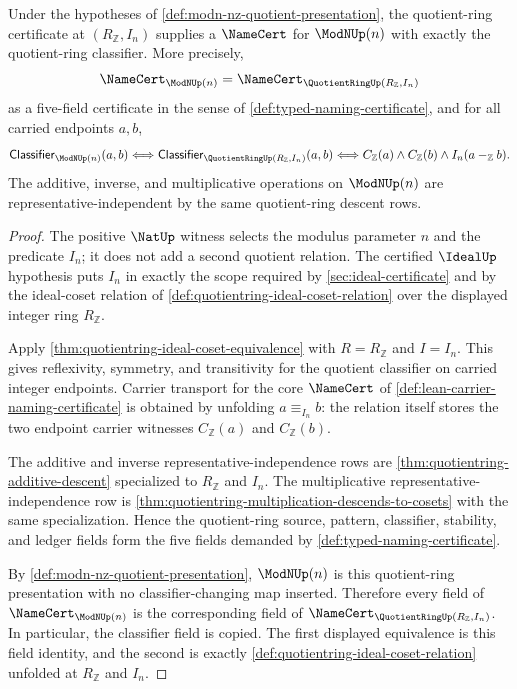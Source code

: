 \begin{theorem}
\label{thm:modn-nz-quotient-certificate}
Under the hypotheses of \autoref{def:modn-nz-quotient-presentation}, the quotient-ring certificate at $(R_{\mathbb{Z}},I_n)$ supplies a $\NameCert$ for $\ModNUp(n)$ with exactly the quotient-ring classifier. More precisely,
$$
\NameCert_{\ModNUp(n)}=
\NameCert_{\QuotientRingUp(R_{\mathbb{Z}},I_n)}
$$
as a five-field certificate in the sense of \autoref{def:typed-naming-certificate}, and for all carried endpoints $a,b$,
$$
\mathsf{Classifier}_{\ModNUp(n)}(a,b)
\Longleftrightarrow
\mathsf{Classifier}_{\QuotientRingUp(R_{\mathbb{Z}},I_n)}(a,b)
\Longleftrightarrow
C_{\mathbb{Z}}(a)\land C_{\mathbb{Z}}(b)\land I_n(a-_{\mathbb{Z}}b).
$$
The additive, inverse, and multiplicative operations on $\ModNUp(n)$ are representative-independent by the same quotient-ring descent rows.
\end{theorem}
\begin{proof}
The positive $\NatUp$ witness selects the modulus parameter $n$ and the predicate $I_n$; it does not add a second quotient relation. The certified $\IdealUp$ hypothesis puts $I_n$ in exactly the scope required by \autoref{sec:ideal-certificate} and by the ideal-coset relation of \autoref{def:quotientring-ideal-coset-relation} over the displayed integer ring $R_{\mathbb{Z}}$.

Apply \autoref{thm:quotientring-ideal-coset-equivalence} with $R=R_{\mathbb{Z}}$ and $I=I_n$. This gives reflexivity, symmetry, and transitivity for the quotient classifier on carried integer endpoints. Carrier transport for the core $\NameCert$ of \autoref{def:lean-carrier-naming-certificate} is obtained by unfolding $a\equiv_{I_n}b$: the relation itself stores the two endpoint carrier witnesses $C_{\mathbb{Z}}(a)$ and $C_{\mathbb{Z}}(b)$.

The additive and inverse representative-independence rows are \autoref{thm:quotientring-additive-descent} specialized to $R_{\mathbb{Z}}$ and $I_n$. The multiplicative representative-independence row is \autoref{thm:quotientring-multiplication-descends-to-cosets} with the same specialization. Hence the quotient-ring source, pattern, classifier, stability, and ledger fields form the five fields demanded by \autoref{def:typed-naming-certificate}.

By \autoref{def:modn-nz-quotient-presentation}, $\ModNUp(n)$ is this quotient-ring presentation with no classifier-changing map inserted. Therefore every field of $\NameCert_{\ModNUp(n)}$ is the corresponding field of $\NameCert_{\QuotientRingUp(R_{\mathbb{Z}},I_n)}$. In particular, the classifier field is copied. The first displayed equivalence is this field identity, and the second is exactly \autoref{def:quotientring-ideal-coset-relation} unfolded at $R_{\mathbb{Z}}$ and $I_n$.
\end{proof}

